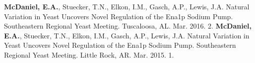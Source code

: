 


\begin{cvpubs}
    \cvpub
        {\textbf{McDaniel, E.A.}, Stuecker, T.N., Elkon, I.M., Gasch, A.P., Lewis, J.A. Natural Variation in Yeast Uncovers Novel Regulation of the Ena1p Sodium Pump. Southeastern Regional Yeast Meeting. Tuscaloosa, AL. Mar. 2016.} %
        {2.} %
    \cvpub
        {\textbf{McDaniel, E.A.}, Stuecker, T.N., Elkon, I.M., Gasch, A.P., Lewis, J.A. Natural Variation in Yeast Uncovers Novel Regulation of the Ena1p Sodium Pump. Southeastern Regional Yeast Meeting. Little Rock, AR. Mar. 2015.}
        {1.}
\end{cvpubs}
